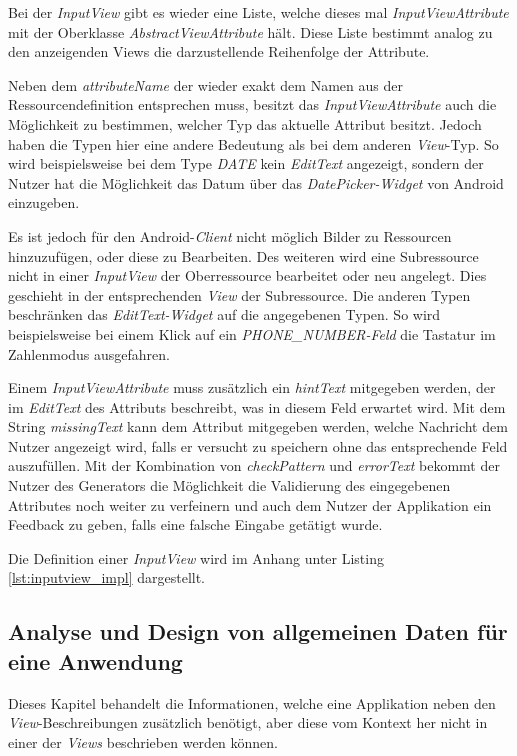 Bei der \textit{InputView} gibt es wieder eine Liste, welche dieses mal \textit{InputViewAttribute} mit der Oberklasse \textit{AbstractViewAttribute} hält. Diese Liste bestimmt analog zu den anzeigenden Views die darzustellende Reihenfolge der Attribute. 

Neben dem \textit{attributeName} der wieder exakt dem Namen aus der Ressourcendefinition entsprechen muss, besitzt das \textit{InputViewAttribute} auch die Möglichkeit zu bestimmen, welcher Typ das aktuelle Attribut besitzt. Jedoch haben die Typen hier eine andere Bedeutung als bei dem anderen \textit{View}-Typ. So wird beispielsweise bei dem Type \textit{DATE} kein \textit{EditText} angezeigt, sondern der Nutzer hat die Möglichkeit das Datum über das \textit{DatePicker-Widget} von Android einzugeben. 

Es ist jedoch für den Android-\textit{Client} nicht möglich Bilder zu Ressourcen hinzuzufügen, oder diese zu Bearbeiten. Des weiteren wird eine Subressource nicht in einer \textit{InputView} der Oberressource bearbeitet oder neu angelegt. Dies geschieht in der entsprechenden \textit{View} der Subressource. Die anderen Typen beschränken das \textit{EditText-Widget} auf die angegebenen Typen. So wird beispielsweise bei einem Klick auf ein \textit{PHONE\_NUMBER-Feld} die Tastatur im Zahlenmodus ausgefahren.

Einem \textit{InputViewAttribute} muss zusätzlich ein \textit{hintText} mitgegeben werden, der im \textit{EditText} des Attributs beschreibt, was in diesem Feld erwartet wird. Mit dem String \textit{missingText} kann dem Attribut mitgegeben werden, welche Nachricht dem Nutzer angezeigt wird, falls er versucht zu speichern ohne das entsprechende Feld auszufüllen. Mit der Kombination von \textit{checkPattern} und \textit{errorText} bekommt der Nutzer des Generators die Möglichkeit die Validierung des eingegebenen Attributes noch weiter zu verfeinern und auch dem Nutzer der Applikation ein Feedback zu geben, falls eine falsche Eingabe getätigt wurde.

Die Definition einer \textit{InputView} wird im Anhang unter Listing \ref{lst:inputview_impl} dargestellt.

\subsection{Analyse und Design von allgemeinen Daten für eine Anwendung}

Dieses Kapitel behandelt die Informationen, welche eine Applikation neben den \textit{View}-Beschreibungen zusätzlich benötigt, aber diese vom Kontext her nicht in einer der \textit{Views} beschrieben werden können.

